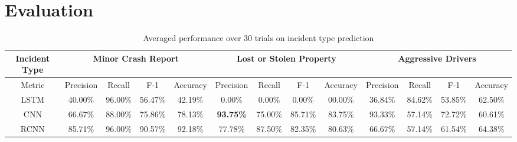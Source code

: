 \section{Evaluation}

\begin{table}[]
\centering
\caption{Averaged performance over 30 trials on incident type prediction}
\tiny
\begin{tabular}{||c|cccc|cccc|cccc||}
\hline
Incident Type & \multicolumn{4}{c|}{Minor Crash Report}                                                                                                    & \multicolumn{4}{c|}{Lost or Stolen Property}                                                                                               & \multicolumn{4}{c||}{Aggressive Drivers}                                                                                                    \\ \hline\hline
Metric        & \multicolumn{1}{c|}{Precision}         & \multicolumn{1}{c|}{Recall}            & \multicolumn{1}{c|}{F-1}              & Accuracy         & \multicolumn{1}{c|}{Precision}         & \multicolumn{1}{c|}{Recall}            & \multicolumn{1}{c|}{F-1}              & Accuracy         & \multicolumn{1}{c|}{Precision}         & \multicolumn{1}{c|}{Recall}            & \multicolumn{1}{c|}{F-1}              & Accuracy         \\ \hline
LSTM          & \multicolumn{1}{c|}{40.00\%}           & \multicolumn{1}{c|}{96.00\%}           & \multicolumn{1}{c|}{56.47\%}          & 42.19\%          & \multicolumn{1}{c|}{0.00\%}            & \multicolumn{1}{c|}{0.00\%}            & \multicolumn{1}{c|}{0.00\%}           & 00.00\%          & \multicolumn{1}{c|}{36.84\%}           & \multicolumn{1}{c|}{84.62\%} & \multicolumn{1}{c|}{53.85\%}          & 62.50\%          \\ \hline
CNN           & \multicolumn{1}{c|}{66.67\%}           & \multicolumn{1}{c|}{88.00\%}           & \multicolumn{1}{c|}{75.86\%}          & 78.13\%          & \multicolumn{1}{c|}{\textbf{93.75\%}} & \multicolumn{1}{c|}{75.00\%}  & \multicolumn{1}{c|}{85.71\%}          & 83.75\%          & \multicolumn{1}{c|}{93.33\%} & \multicolumn{1}{c|}{57.14\%}           & \multicolumn{1}{c|}{72.72\%}          & 60.61\%          \\ \hline
RCNN          & \multicolumn{1}{c|}{85.71\%}           & \multicolumn{1}{c|}{96.00\%}  & \multicolumn{1}{c|}{90.57\%}          & 92.18\%          & \multicolumn{1}{c|}{77.78\%}           & \multicolumn{1}{c|}{87.50\%}           & \multicolumn{1}{c|}{82.35\%}          & 80.63\%          & \multicolumn{1}{c|}{66.67\%}           & \multicolumn{1}{c|}{57.14\%}           & \multicolumn{1}{c|}{61.54\%}          & 64.38\%          \\ \hline

\end{tabular}
\end{table}
